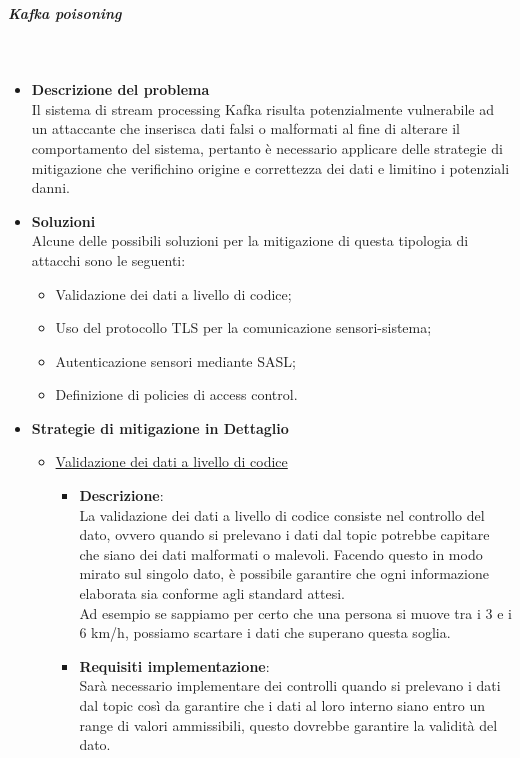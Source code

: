 \documentclass[10pt]{article}
\newcommand{\mysubparagraph}[1]{\subparagraph{#1}\mbox{}\\}
\begin{document}
        \mysubparagraph{Kafka poisoning}
        \begin{itemize}
            \item \textbf{Descrizione del problema}\\
            Il sistema di stream processing Kafka risulta potenzialmente vulnerabile ad un attaccante che inserisca
            dati falsi o malformati al fine di alterare il comportamento del sistema, pertanto è necessario applicare delle strategie
            di mitigazione che verifichino origine e correttezza dei dati e limitino i potenziali danni.

            \item \textbf{Soluzioni}\\
            Alcune delle possibili soluzioni per la mitigazione di questa tipologia di attacchi sono le seguenti:
            \begin{itemize}
                \item Validazione dei dati a livello di codice;
                \item Uso del protocollo TLS per la comunicazione sensori-sistema;
                \item Autenticazione sensori mediante SASL;
                \item Definizione di policies di access control.
            \end{itemize}

            \item \textbf{Strategie di mitigazione in Dettaglio}
            \begin{itemize}

                \item \underline{Validazione dei dati a livello di codice}
                \begin{itemize}
                    \item \textbf{Descrizione}:\\
                    La validazione dei dati a livello di codice consiste nel controllo del dato, ovvero quando si prelevano i dati dal topic potrebbe capitare che siano dei dati malformati o malevoli.
                    Facendo questo in modo mirato sul singolo dato, è possibile garantire che ogni informazione elaborata sia conforme agli standard attesi. \\
                    Ad esempio se sappiamo per certo che una persona si muove tra i 3 e i 6 km/h, possiamo scartare i dati che superano questa soglia.

                    \item \textbf{Requisiti implementazione}:\\
                    Sarà necessario implementare dei controlli quando si prelevano i dati dal topic così da garantire che i dati al loro interno siano entro un range di valori ammissibili, questo dovrebbe garantire la validità del dato.


\end{itemize}
\end{itemize}
\end{itemize}
\end{document}

